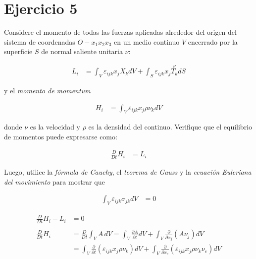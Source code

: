 \documentclass[a4paper,10pt,twoside,final,spanish]{article}
\begin{document}
\section*{Ejercicio 5}

Considere el momento de todas las fuerzas aplicadas alrededor del origen del sistema de coordenadas $O-x_{1}x_{2}x_{3}$ en un medio continuo $V$ encerrado por la superficie $S$ de normal saliente unitaria $\nu$:

\begin{align*}
L_{i} &= \int_{V}\varepsilon_{ijk}x_{j}X_{k}dV
+\int_{S}\varepsilon_{ijk}x_{j}\stackrel{\nu}{T_{k}}dS
\end{align*}

y el \textit{momento de momentum}

\begin{align*}
H_{i} &= \int_{V}\varepsilon_{ijk}x_{j}\rho\nu_{k}dV
\end{align*}

donde $\nu$ es la velocidad y $\rho$ es la densidad del continuo. Verifique que el equilibrio de momentos puede expresarse como:

\begin{align*}
\frac{D}{Dt}H_{i} &= L_{i}
\end{align*}

Luego, utilice la \textit{fórmula de Cauchy}, el \textit{teorema de Gauss} y la \textit{ecuación Euleriana del movimiento} para mostrar que

\begin{align*}
\int_{V}\varepsilon_{ijk}\sigma_{jk}dV &= 0
\end{align*}

\dotfill

\begin{align*}
\frac{D}{Dt}H_{i}-L_{i} &= 0 \\ \\
\frac{D}{Dt}H_{i} &= \frac{D}{Dt}\int_{V}A\,dV
=\int_{V}\frac{\partial A}{\partial t}dV
+\int_{V}\frac{\partial}{\partial x_{j}}(A\nu_{j})dV \\
&= \int_{V}\frac{\partial}{\partial t}(\varepsilon_{ijk}x_{j}\rho\nu_{k})dV
+\int_{V}\frac{\partial}{\partial x_{e}}(\varepsilon_{ijk}x_{j}\rho\nu_{k}\nu_{e})dV \\ \\
\end{align*}
\end{document}
